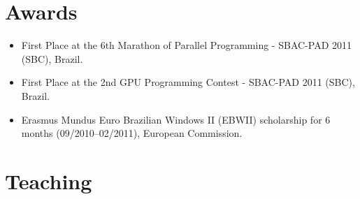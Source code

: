 \documentclass[11pt,a4paper]{article}
\begin{document}
\section{Awards}

\begin{itemize} \itemsep -2pt
\item First Place at the 6th Marathon of Parallel Programming - SBAC-PAD 2011 (SBC), Brazil. 
\item First Place at the 2nd GPU Programming Contest - SBAC-PAD 2011 (SBC), Brazil. 
\item Erasmus Mundus Euro Brazilian Windows II (EBWII) scholarship for 6 months
(09/2010--02/2011), European Commission.
\end{itemize}

\section{Teaching}
\end{document}
